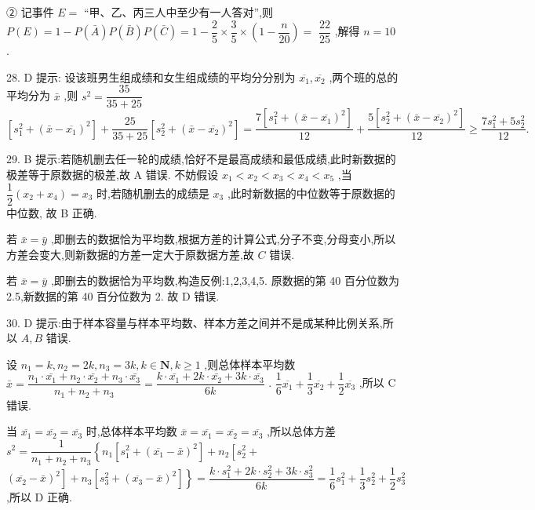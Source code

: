 ② 记事件 $E =$ “甲、乙、丙三人中至少有一人答对”,则 $P\left( E\right)  = 1 - P\left( \bar{A}\right) P\left( \bar{B}\right) P\left( \bar{C}\right)  = 1 - \dfrac{2}{5} \times  \dfrac{3}{5} \times  \left( {1 - \dfrac{n}{20}}\right)  =$  $\dfrac{22}{25}$ ,解得 $n = {10}$ .

28. D 提示: 设该班男生组成绩和女生组成绩的平均分分别为 $\overline{{x}_{1}},\overline{{x}_{2}}$ ,两个班的总的平均分为 $\bar{x}$ ,则 ${s}^{2} = \dfrac{35}{{35} + {25}}$  $\left\lbrack  {{s}_{1}^{2} + {\left( \bar{x} - \overline{{x}_{1}}\right) }^{2}}\right\rbrack   + \dfrac{25}{{35} + {25}}\left\lbrack  {{s}_{2}^{2} + {\left( \bar{x} - \overline{{x}_{2}}\right) }^{2}}\right\rbrack   = \dfrac{7\left\lbrack  {{s}_{1}^{2} + {\left( \bar{x} - \overline{{x}_{1}}\right) }^{2}}\right\rbrack  }{12} + \dfrac{5\left\lbrack  {{s}_{2}^{2} + {\left( \bar{x} - \overline{{x}_{2}}\right) }^{2}}\right\rbrack  }{12} \geq  \dfrac{7{s}_{1}^{2} + 5{s}_{2}^{2}}{12}.$

29. B 提示:若随机删去任一轮的成绩,恰好不是最高成绩和最低成绩,此时新数据的极差等于原数据的极差,故 A 错误. 不妨假设 ${x}_{1} < {x}_{2} < {x}_{3} < {x}_{4} < {x}_{5}$ ,当 $\dfrac{1}{2}\left( {{x}_{2} + {x}_{4}}\right)  = {x}_{3}$ 时,若随机删去的成绩是 ${x}_{3}$ ,此时新数据的中位数等于原数据的中位数, 故 B 正确.

若 $\bar{x} = \bar{y}$ ,即删去的数据恰为平均数,根据方差的计算公式,分子不变,分母变小,所以方差会变大,则新数据的方差一定大于原数据方差,故 $C$ 错误.

若 $\bar{x} = \bar{y}$ ,即删去的数据恰为平均数,构造反例:1,2,3,4,5. 原数据的第 40 百分位数为 2.5,新数据的第 40 百分位数为 2. 故 D 错误.

30. D 提示:由于样本容量与样本平均数、样本方差之间并不是成某种比例关系,所以 $A,B$ 错误.

设 ${n}_{1} = k,{n}_{2} = {2k},{n}_{3} = {3k},k \in  \mathbf{N},k \geq  1$ ,则总体样本平均数 $\bar{x} = \dfrac{{n}_{1} \cdot  \bar{{x}_{1}} + {n}_{2} \cdot  \bar{{x}_{2}} + {n}_{3} \cdot  \bar{{x}_{3}}}{{n}_{1} + {n}_{2} + {n}_{3}} = \dfrac{k \cdot  \bar{{x}_{1}} + {2k} \cdot  \bar{{x}_{2}} + {3k} \cdot  \bar{{x}_{3}}}{6k}$ . $\dfrac{1}{6}\overline{{x}_{1}} + \dfrac{1}{3}\overline{{x}_{2}} + \dfrac{1}{2}\overline{{x}_{3}}$ ,所以 C 错误.

当 $\overline{{x}_{1}} = \overline{{x}_{2}} = \overline{{x}_{3}}$ 时,总体样本平均数 $\overline{x} = \overline{{x}_{1}} = \overline{{x}_{2}} = \overline{{x}_{3}}$ ,所以总体方差 ${s}^{2} = \dfrac{1}{{n}_{1} + {n}_{2} + {n}_{3}}\left\{  {{n}_{1}\left\lbrack  {{s}_{1}^{2} + {\left( \overline{{x}_{1}} - \bar{x}\right) }^{2}}\right\rbrack   + {n}_{2}\left\lbrack  {{s}_{2}^{2} + }\right. }\right.$  $\left. {\left. {\left( \overline{{x}_{2}} - \bar{x}\right) }^{2}\right\rbrack   + {n}_{3}\left\lbrack  {{s}_{3}^{2} + {\left( \overline{{x}_{3}} - \bar{x}\right) }^{2}}\right\rbrack  }\right\}   = \dfrac{k \cdot  {s}_{1}^{2} + {2k} \cdot  {s}_{2}^{2} + {3k} \cdot  {s}_{3}^{2}}{6k} = \dfrac{1}{6}{s}_{1}^{2} + \dfrac{1}{3}{s}_{2}^{2} + \dfrac{1}{2}{s}_{3}^{2}$ ,所以 D 正确.

